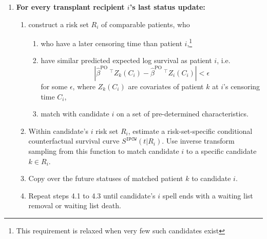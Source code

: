 \documentclass{standalone}
\begin{document}
\begin{tcolorbox}[
		colback=gray!5!white,
		colframe=black,
		title={\textbf{Algorithm B.1: status completion procedure}},
		fonttitle=\bfseries,
		width=1.1\textwidth,
		sharp corners=south,
		boxrule=0.8pt
		]
\begin{enumerate}[leftmargin=*, itemsep=0.7em]
			\item \textbf{For every transplant recipient $i$'s last status update:}
			\begin{enumerate}[label*=\arabic*.]
				\item construct a risk set $R_i$ of comparable patients, who
				\begin{enumerate}[label=(\alph*)]
					\item who have a later censoring time than patient $i$,\footnote{This requirement is relaxed when very few such candidates exist}
					\item have similar predicted expected log survival as patient $i$, i.e. \[|\hat{\beta}^{\text{PO}}\ ^\intercal Z_k(C_{i}) - 
					\hat{\beta}^{\text{PO}}\ ^\intercal Z_i(C_{i})| < \epsilon\]
					for some \(\epsilon\), where \(Z_k(C_{i})\) are covariates of
					patient \(k\) at \(i\)'s censoring time \(C_i\),
					\item match with candidate $i$ on a set of pre-determined characteristics.
				\end{enumerate}
				\item Within candidate's $i$ risk set $R_i$, estimate a risk-set-specific conditional counterfactual survival curve $S^{\texttt{IPCW}}(t|R_i)$. Use inverse transform sampling from this function to match candidate $i$ to a specific candidate $k \in R_i$.
				\item Copy over the future statuses of matched patient $k$ to candidate $i$.
				\item Repeat steps 4.1 to 4.3 until candidate's $i$ spell ends with a waiting list removal or waiting list death.
			\end{enumerate}
			
		\end{enumerate}
	\end{tcolorbox}
	
\end{document}

